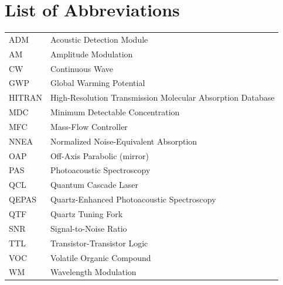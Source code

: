 \chapter*{List of Abbreviations}

\noindent
\begin{tabular}{@{}l@{\hspace{1.5em}}l@{}}
ADM    & Acoustic Detection Module \\
AM     & Amplitude Modulation \\
CW     & Continuous Wave \\
GWP    & Global Warming Potential \\
HITRAN & High-Resolution Transmission Molecular Absorption Database \\
MDC    & Minimum Detectable Concentration \\
MFC    & Mass-Flow Controller \\
NNEA   & Normalized Noise-Equivalent Absorption \\
OAP    & Off-Axis Parabolic (mirror) \\
PAS    & Photoacoustic Spectroscopy \\
QCL    & Quantum Cascade Laser \\
QEPAS  & Quartz-Enhanced Photoacoustic Spectroscopy \\
QTF    & Quartz Tuning Fork \\
SNR    & Signal-to-Noise Ratio \\
TTL    & Transistor-Transistor Logic \\
VOC    & Volatile Organic Compound \\
WM     & Wavelength Modulation \\
\end{tabular}
